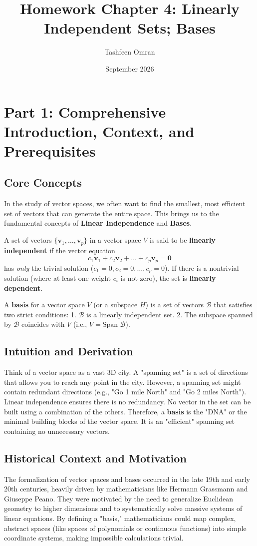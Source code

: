 \documentclass[12pt]{article}
\title{Homework Chapter 4: Linearly Independent Sets; Bases}
\author{Tashfeen Omran}
\date{September 2026}
\begin{document}
\maketitle
\tableofcontents
\newpage

\section{Part 1: Comprehensive Introduction, Context, and Prerequisites}

\subsection{Core Concepts}
In the study of vector spaces, we often want to find the smallest, most efficient set of vectors that can generate the entire space. This brings us to the fundamental concepts of \textbf{Linear Independence} and \textbf{Bases}. 

A set of vectors $\{\mathbf{v}_1, \dots, \mathbf{v}_p\}$ in a vector space $V$ is said to be \textbf{linearly independent} if the vector equation
\[ c_1\mathbf{v}_1 + c_2\mathbf{v}_2 + \dots + c_p\mathbf{v}_p = \mathbf{0} \]
has \textit{only} the trivial solution ($c_1 = 0, c_2 = 0, \dots, c_p = 0$). If there is a nontrivial solution (where at least one weight $c_i$ is not zero), the set is \textbf{linearly dependent}.

A \textbf{basis} for a vector space $V$ (or a subspace $H$) is a set of vectors $\mathcal{B}$ that satisfies two strict conditions:
1. $\mathcal{B}$ is a linearly independent set.
2. The subspace spanned by $\mathcal{B}$ coincides with $V$ (i.e., $V = \text{Span } \mathcal{B}$).

\subsection{Intuition and Derivation}
Think of a vector space as a vast 3D city. A "spanning set" is a set of directions that allows you to reach any point in the city. However, a spanning set might contain redundant directions (e.g., "Go 1 mile North" and "Go 2 miles North"). 
Linear independence ensures there is no redundancy. No vector in the set can be built using a combination of the others. Therefore, a \textbf{basis} is the "DNA" or the minimal building blocks of the vector space. It is an "efficient" spanning set containing no unnecessary vectors.

\subsection{Historical Context and Motivation}
The formalization of vector spaces and bases occurred in the late 19th and early 20th centuries, heavily driven by mathematicians like Hermann Grassmann and Giuseppe Peano. They were motivated by the need to generalize Euclidean geometry to higher dimensions and to systematically solve massive systems of linear equations. By defining a "basis," mathematicians could map complex, abstract spaces (like spaces of polynomials or continuous functions) into simple coordinate systems, making impossible calculations trivial.
\end{document}
